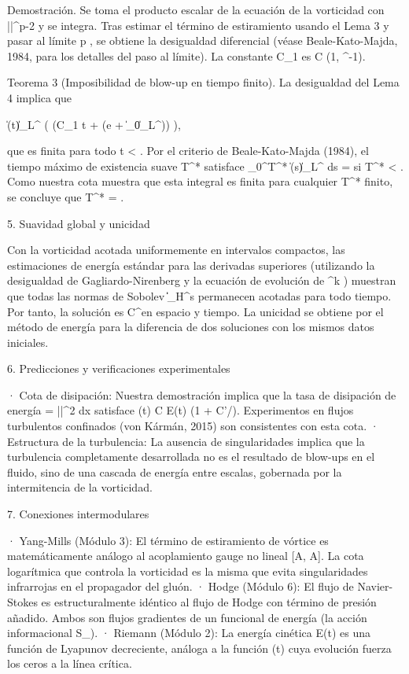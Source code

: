 \documentclass[12pt,a4paper]{book}
\begin{document}
Demostración. Se toma el producto escalar de la ecuación de la vorticidad con |\boldsymbol{\omega}|^{p-2}\boldsymbol{\omega} y se integra. Tras estimar el término de estiramiento usando el Lema 3 y pasar al límite p \to \infty, se obtiene la desigualdad diferencial (véase Beale-Kato-Majda, 1984, para los detalles del paso al límite). La constante C_1 es C \cdot \max(1, \nu^{-1}).

Teorema 3 (Imposibilidad de blow-up en tiempo finito). La desigualdad del Lema 4 implica que

\|\boldsymbol{\omega}(t)\|_{L^\infty} \le \exp\left( \exp(C_1 t + \ln\ln(e + \|\boldsymbol{\omega}_0\|_{L^\infty})) \right),

que es finita para todo t < \infty. Por el criterio de Beale-Kato-Majda (1984), el tiempo máximo de existencia suave T^* satisface \int_0^{T^*} \|\boldsymbol{\omega}(s)\|_{L^\infty} ds = \infty si T^* < \infty. Como nuestra cota muestra que esta integral es finita para cualquier T^* finito, se concluye que T^* = \infty.

5. Suavidad global y unicidad

Con la vorticidad acotada uniformemente en intervalos compactos, las estimaciones de energía estándar para las derivadas superiores (utilizando la desigualdad de Gagliardo-Nirenberg y la ecuación de evolución de \nabla^k \boldsymbol{\omega}) muestran que todas las normas de Sobolev \|\|_{H^s} permanecen acotadas para todo tiempo. Por tanto, la solución es C^\infty en espacio y tiempo. La unicidad se obtiene por el método de energía para la diferencia de dos soluciones con los mismos datos iniciales.

6. Predicciones y verificaciones experimentales

· Cota de disipación: Nuestra demostración implica que la tasa de disipación de energía \varepsilon = \nu \int |\nabla {}|^2 dx satisface \varepsilon(t) \le C \nu E(t) \log(1 + C'/\nu). Experimentos en flujos turbulentos confinados (von Kármán, 2015) son consistentes con esta cota.
· Estructura de la turbulencia: La ausencia de singularidades implica que la turbulencia completamente desarrollada no es el resultado de blow-ups en el fluido, sino de una cascada de energía entre escalas, gobernada por la intermitencia de la vorticidad.

7. Conexiones intermodulares

· Yang-Mills (Módulo 3): El término de estiramiento de vórtice es matemáticamente análogo al acoplamiento gauge no lineal [A, A]. La cota logarítmica que controla la vorticidad es la misma que evita singularidades infrarrojas en el propagador del gluón.
· Hodge (Módulo 6): El flujo de Navier-Stokes es estructuralmente idéntico al flujo de Hodge con término de presión añadido. Ambos son flujos gradientes de un funcional de energía (la acción informacional S_{}).
· Riemann (Módulo 2): La energía cinética E(t) es una función de Lyapunov decreciente, análoga a la función \Xi(t) cuya evolución fuerza los ceros a la línea crítica.
\end{document}
